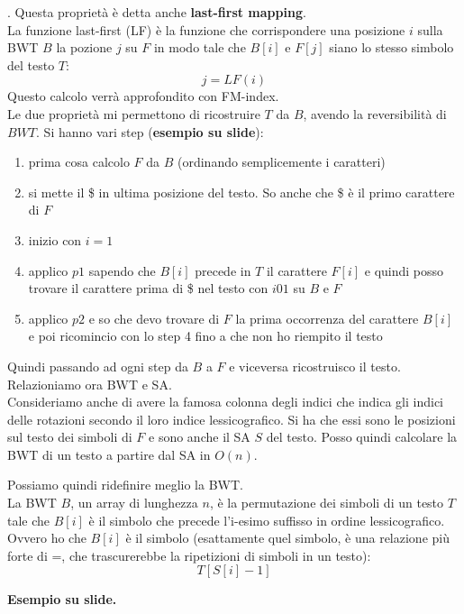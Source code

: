 \documentclass[a4paper,12pt, oneside]{book}
\begin{document}
. Questa proprietà è detta anche \textbf{last-first mapping}.\\
La funzione last-first (LF) è la funzione che corrispondere una posizione $i$
sulla BWT $B$ la pozione $j$ su $F$ in modo tale che $B[i]$ e $F[j]$ siano lo
stesso simbolo del testo $T$:
\[j=LF(i)\]
Questo calcolo verrà approfondito con FM-index.\\
Le due proprietà mi permettono di ricostruire $T$ da $B$, avendo la
reversibilità di $BWT$. Si hanno vari step (\textbf{esempio su slide}):
\begin{enumerate}
  \item prima cosa calcolo $F$ da $B$ (ordinando semplicemente i caratteri)
  \item si mette il \$ in ultima posizione del testo. So anche che \$ è il primo
  carattere di $F$
  \item inizio con $i=1$
  \item applico $p1$ sapendo che $B[i]$ precede in $T$ il carattere $F[i]$ e
  quindi posso trovare il carattere prima di \$ nel testo con $i01$ su $B$ e $F$
  \item applico $p2$ e so che devo trovare di $F$ la prima occorrenza del
  carattere $B[i]$ e poi ricomincio con lo step 4 fino a che non ho riempito il
  testo
\end{enumerate}
Quindi passando ad ogni step da $B$ a $F$ e viceversa ricostruisco il testo.\\
Relazioniamo ora BWT e SA.\\
Consideriamo anche di avere la famosa colonna degli indici che indica gli indici
delle rotazioni secondo il loro indice lessicografico. Si ha che essi sono le
posizioni sul testo dei simboli di $F$ e sono anche il SA $S$ del testo. Posso
quindi calcolare la BWT di un testo a partire dal SA in $O(n)$. 
\begin{definizione}
  Possiamo quindi ridefinire meglio la BWT.\\
  La BWT $B$, un array di lunghezza $n$, è la permutazione dei simboli di
  un testo $T$ tale che $B[i]$ è 
  il simbolo che precede l'i-esimo suffisso in ordine lessicografico. Ovvero ho
  che $B[i]$ è il simbolo (esattamente quel simbolo, è una relazione più forte
  di =, che trascurerebbe la ripetizioni di simboli in un testo):
  \[T[S[i]-1]\]
\end{definizione}
\textbf{Esempio su slide.}
\end{document}
